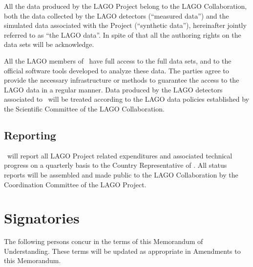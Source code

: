 All the data produced by the LAGO Project belong to the LAGO Collaboration,
both the data collected by the LAGO detectors (``measured data'') and the
simulated data associated with the Project (``synthetic data''), hereinafter
jointly referred to as ``the LAGO data''. In spite of that all the authoring
rights on the data sets will be acknowledge.

All the LAGO members of \institution~have full access to the full data sets,
and to the official software tools developed to analyze these data. The parties
agree to provide the necessary infrastructure or methods to guarantee the
access to the LAGO data in a regular manner. Data produced by the LAGO
detectors associated to \institution~will be treated according to the LAGO data
policies established by the Scientific Committee of the LAGO Collaboration. 

\subsection{Reporting}

\institution~will report all LAGO Project related expenditures and associated
technical progress on a quarterly basis to the Country Representative of
\country. All status reports will be assembled and made public to the LAGO
Collaboration by the Coordination Committee of the LAGO Project.

\section{Signatories}

The following persons concur in the terms of this Memorandum of 
Understanding.  These terms will be updated as appropriate in Amendments to 
this Memorandum.



